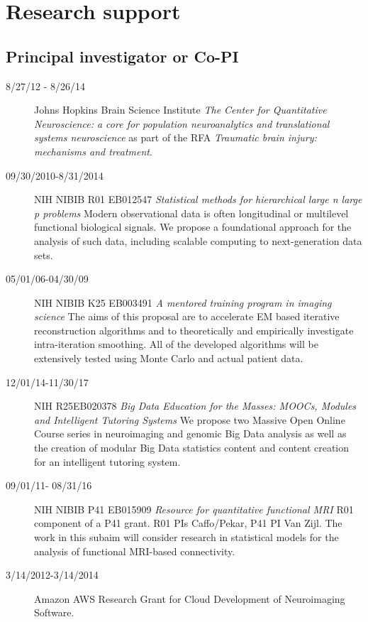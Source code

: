 \documentclass[12pt]{article}
\begin{document}
\section*{Research support} 
\subsection*{Principal investigator or Co-PI}
\begin{description}
\item[\textnormal{8/27/12 - 8/26/14}] Johns Hopkins Brain Science Institute {\it The Center for Quantitative Neuroscience: a core for population neuroanalytics and translational systems neuroscience} as part of the RFA {\it Traumatic brain injury: mechanisms and treatment}.
\item[\textnormal{09/30/2010-8/31/2014}] NIH NIBIB R01 EB012547 {\it Statistical methods for hierarchical large n large p problems} Modern observational data is often longitudinal or multilevel functional biological signals. We propose a foundational approach for the analysis of such data, including scalable computing to next-generation data sets.
\item[\textnormal{05/01/06-04/30/09}] NIH NIBIB K25 EB003491 {\it A
    mentored training program in imaging science} 
  The aims of this proposal are to accelerate EM based iterative
  reconstruction algorithms and to theoretically and empirically
  investigate intra-iteration smoothing.  All of the developed
  algorithms will be extensively tested using Monte Carlo and actual
  patient data.
\item[\textnormal{12/01/14-11/30/17}] NIH R25EB020378 {\it Big Data Education for the Masses: MOOCs, Modules and Intelligent Tutoring Systems} We propose two Massive Open Online Course series in neuroimaging and genomic Big Data analysis as well
as the creation of modular Big Data statistics content and content creation for an intelligent tutoring system.
\item[\textnormal{09/01/11- 08/31/16}] NIH NIBIB P41 EB015909 {\it Resource for quantitative functional MRI} R01 component of a P41 grant. R01 PIs Caffo/Pekar, P41 PI Van Zijl. The work in this subaim will consider research in statistical models for the analysis of functional MRI-based connectivity.
\item[\textnormal{3/14/2012-3/14/2014}] Amazon AWS Research Grant for Cloud Development of Neuroimaging Software.
\end{description}
\end{document}
